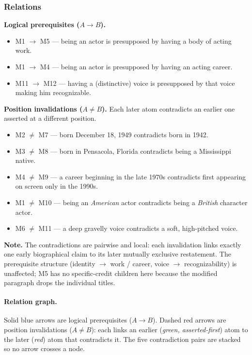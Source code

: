 \documentclass[11pt]{article}
\begin{document}
\subsubsection*{Relations}

\textbf{Logical prerequisites ($A \rightarrow B$).}
\begin{itemize}[leftmargin=*]
  \item M1 $\rightarrow$ M5 --- being an actor is presupposed by having a body of acting work.
  \item M1 $\rightarrow$ M4 --- being an actor is presupposed by having an acting career.
  \item M11 $\rightarrow$ M12 --- having a (distinctive) voice is presupposed by that voice making him recognizable.
\end{itemize}

\noindent
\textbf{Position invalidations ($A \neq B$).} Each later atom contradicts an
earlier one asserted at a different position.
\begin{itemize}[leftmargin=*]
  \item M2 $\neq$ M7 --- born December 18, 1949 contradicts born in 1942.
  \item M3 $\neq$ M8 --- born in Pensacola, Florida contradicts being a Mississippi native.
  \item M4 $\neq$ M9 --- a career beginning in the late 1970s contradicts first appearing on screen only in the 1990s.
  \item M1 $\neq$ M10 --- being an \emph{American} actor contradicts being a \emph{British} character actor.
  \item M6 $\neq$ M11 --- a deep gravelly voice contradicts a soft, high-pitched voice.
\end{itemize}

\noindent
\textbf{Note.} The contradictions are pairwise and local: each invalidation links
exactly one early biographical claim to its later mutually exclusive restatement.
The prerequisite structure (identity $\to$ work / career, voice $\to$
recognizability) is unaffected; M5 has no specific-credit children here because
the modified paragraph drops the individual titles.

\paragraph{Relation graph.}
Solid blue arrows are logical prerequisites ($A \rightarrow B$). Dashed red
arrows are position invalidations ($A \neq B$): each links an earlier
(\emph{green, asserted-first}) atom to the later (\emph{red}) atom that
contradicts it. The five contradiction pairs are stacked so no arrow crosses a
node.
\end{document}
